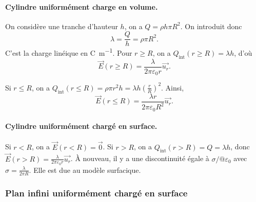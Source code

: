             \paragraph{Cylindre uniformément charge en volume.} 
            
                On considère une tranche d'hauteur $h$, on a $Q=\rho h\pi R^{2}$. On introduit donc 
                \begin{equation*}
                    \boxed{
                        \lambda=\frac{Q}{h}=\rho\pi R^{2}.
                    }
                \end{equation*}
                C'est la charge linéique en \si{\coulomb\per\metre}. Pour $r\geqslant R$, on a $Q_{\text{int}}(r\geqslant R)=\lambda h$, d'où 
                \begin{equation*}
                    \boxed{
                        \vec{E}(r\geqslant R)=\frac{\lambda}{2\pi\varepsilon_{0}r}\vec{u_r}.
                    }
                \end{equation*}

                Si $r\leqslant R$, on a $Q_{\text{int}}(r\leqslant R)=\rho \pi r^{2}h=\lambda h\left(\frac{r}{R}\right)^{2}$. Ainsi,
                \begin{equation*}
                    \boxed{
                        \vec{E}(r\leqslant R)=\frac{\lambda r}{2\pi\varepsilon_{0}R^{2}}\vec{u_r}.
                    }
                \end{equation*}

            \paragraph{Cylindre uniformément chargé en surface.} 

                Si $r<R$, on a $\vec{E}(r<R)=\vec{0}$. Si $r>R$, on a $Q_{\text{int}}(r>R)=Q=\lambda h$, donc $\vec{E}(r>R)=\frac{\lambda}{2\pi\varepsilon_{0}r}\vec{u_r}$. À nouveau, il y a une discontinuité égale à $\sigma/@\varepsilon_{0}$ avec $\sigma=\frac{\lambda}{2\pi R}$. Elle est due au modèle surfacique.

            
        \subsubsection{Plan infini uniformément chargé en surface}


